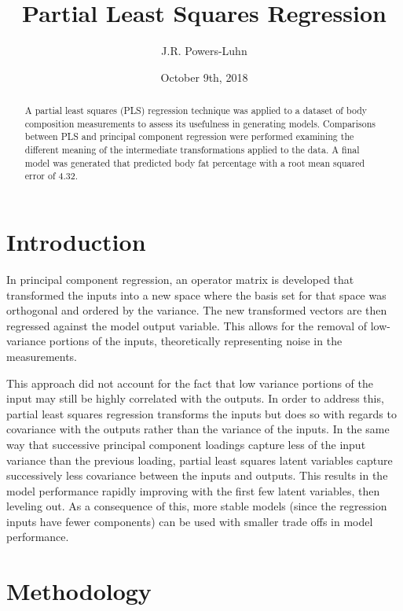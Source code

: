 \documentclass{IEEEtran}
\author{J.R. Powers-Luhn}
\title{Partial Least Squares Regression}
\date{October 9th, 2018}
\begin{document}
\maketitle

\begin{abstract}

A partial least squares (PLS) regression technique was applied to a dataset of body composition measurements to assess its usefulness in generating models. Comparisons between PLS and principal component regression were performed examining the different meaning of the intermediate transformations applied to the data. A final model was generated that predicted body fat percentage with a root mean squared error of \num{4.32}.

\end{abstract}

\section{Introduction}

In principal component regression, an operator matrix is developed that transformed the inputs into a new space where the basis set for that space was orthogonal and ordered by the variance. The new transformed vectors are then regressed against the model output variable. This allows for the removal of low-variance portions of the inputs, theoretically representing noise in the measurements.

This approach did not account for the fact that low variance portions of the input may still be highly correlated with the outputs. In order to address this, partial least squares regression transforms the inputs but does so with regards to covariance with the outputs rather than the variance of the inputs. In the same way that successive principal component loadings capture less of the input variance than the previous loading, partial least squares latent variables capture successively less covariance between the inputs and outputs. This results in the model performance rapidly improving with the first few latent variables, then leveling out. As a consequence of this, more stable models (since the regression inputs have fewer components) can be used with smaller trade offs in model performance.

\section{Methodology}
\end{document}
